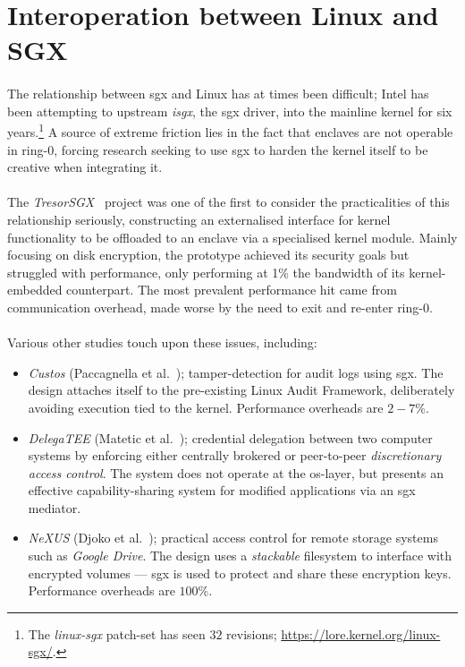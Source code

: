 \section{Interoperation between Linux and SGX} 
\paragraph{} The relationship between \acrshort{sgx} and Linux has at times been difficult; Intel has been attempting to upstream \textit{isgx}, the \acrshort{sgx} driver, into the mainline kernel for six years.\footnote{The \textit{linux-sgx} patch-set has seen $32$ revisions; \url{https://lore.kernel.org/linux-sgx/}.} A source of extreme friction lies in the fact that enclaves are not operable in ring-0, forcing research seeking to use \acrshort{sgx} to harden the kernel itself to be creative when integrating it.

\paragraph{} The \textit{TresorSGX}~\cite{10.1145/3007788.3007796} project was one of the first to consider the practicalities of this relationship seriously, constructing an externalised interface for kernel functionality to be offloaded to an enclave via a specialised kernel module. Mainly focusing on disk encryption, the prototype achieved its security goals but struggled with performance, only performing at 1\% the bandwidth of its kernel-embedded counterpart. The most prevalent performance hit came from communication overhead, made worse by the need to exit and re-enter ring-0.


\paragraph{} Various other studies touch upon these issues, including:

\begin{itemize}
    \item \textit{Custos} (Paccagnella et al.~\cite{Karande2017SGXLogSS}); tamper-detection for audit logs using \acrshort{sgx}. The design attaches itself to the pre-existing Linux Audit Framework, deliberately avoiding execution tied to the kernel. Performance overheads are $2-7$\%. 
    \item \textit{DelegaTEE} (Matetic et al.~\cite{10.5555/3277203.3277308}); credential delegation between two computer systems by enforcing either centrally brokered or peer-to-peer \textit{discretionary access control}. The system does not operate at the \acrshort{os}-layer, but presents an effective capability-sharing system for modified applications via an \acrshort{sgx} mediator.
    \item \textit{NeXUS} (Djoko et al.~\cite{nexus8809505}); practical access control for remote storage systems such as \textit{Google Drive}. The design uses a \textit{stackable} filesystem to interface with encrypted volumes --- \acrshort{sgx} is used to protect and share these encryption keys. Performance overheads are $100$\%.
\end{itemize}


